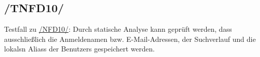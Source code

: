 \subsection*{/TNFD10/}
\label{/TNFD10/} Testfall zu \hyperref[/NFD10/]{/NFD10/}: Durch \gls{statische Analyse} kann geprüft werden, dass ausschließlich die Anmeldenamen bzw. E-Mail-Adressen, der \Gls{Suchverlauf} und die \glspl{lokal}n \Glspl{Alias} der \Glspl{Benutzer} gespeichert werden.
